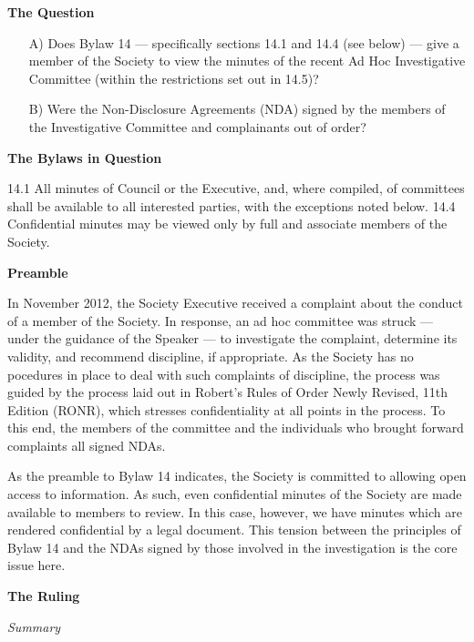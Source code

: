 \begin{longenum}[ label*=\arabic*., align=left]
\item \textbf{The Question}

\begin{itemize}
\item[A)] Does Bylaw 14 --- specifically sections 14.1 and 14.4 (see below) --- give a member of the Society to view the minutes of the recent Ad Hoc Investigative Committee (within the restrictions set out in 14.5)?
\item[B)]  Were the Non-Disclosure Agreements (NDA) signed by the members of the Investigative Committee and complainants out of order?
\end{itemize}

\item \textbf{The Bylaws in Question}

14.1 All minutes of Council or the Executive, and,  where compiled,  of committees shall be available to all interested parties, with the exceptions noted below.
14.4 Confidential minutes may be viewed only by full and associate members of the Society.

\item \textbf{Preamble}

In November 2012, the Society Executive received a complaint about the conduct of a member of the Society. In response, an ad hoc committee was struck --- under the guidance of the Speaker --- to investigate the complaint, determine its validity, and recommend discipline, if appropriate. As the Society has no pocedures in place to deal with such complaints of discipline, the process was guided by the process laid out in Robert's Rules of Order Newly Revised, 11th Edition (RONR), which stresses confidentiality at all points in the process. To this end, the members of the committee and the individuals who brought forward complaints all signed NDAs.

As the preamble to Bylaw 14 indicates, the Society is committed to allowing open access to information. As such, even confidential minutes of the Society are made available to members to review. In this case, however, we have minutes which are rendered confidential by a legal document. This tension between the principles of Bylaw 14 and the NDAs signed by those involved in the investigation is the core issue here.

\item \textbf{The Ruling}
\begin{longenum}
\item \textit{Summary}


\end{longenum}
\end{longenum}
